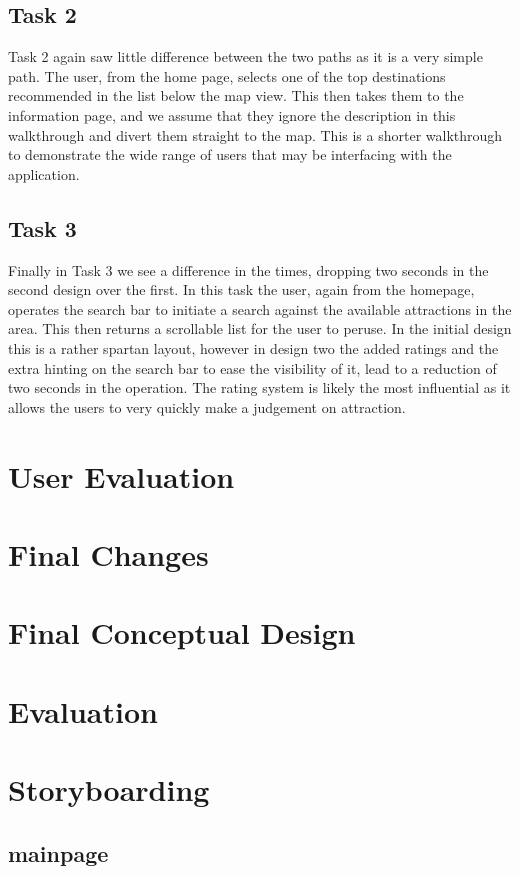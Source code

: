 \documentclass{article}
\begin{document}
\subsection{Task 2}
Task 2 again saw little difference between the two paths as it is a very simple path.
The user, from the home page, selects one of the top destinations recommended in the list below the map view.
This then takes them to the information page, and we assume that they ignore the description in this walkthrough and divert them straight to the map.
This is a shorter walkthrough to demonstrate the wide range of users that may be interfacing with the application.
\subsection{Task 3}
Finally in Task 3 we see a difference in the times, dropping two seconds in the second design over the first.
In this task the user, again from the homepage, operates the search bar to initiate a search against the available attractions in the area.
This then returns a scrollable list for the user to peruse.
In the initial design this is a rather spartan layout, however in design two the added ratings and the extra hinting on the search bar to ease the visibility of it, lead to a reduction of two seconds in the operation.
The rating system is likely the most influential as it allows the users to very quickly make a judgement on attraction.
\section{User Evaluation}
\section{Final Changes}
\section{Final Conceptual Design}
\section{Evaluation}
\section{Storyboarding}
\subsection{mainpage}
\end{document}
